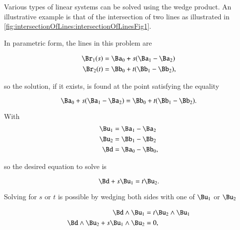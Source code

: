 %
%
Various types of linear systems can be solved using the wedge product.
An illustrative example is that of the intersection of two lines as illustrated in \cref{fig:intersectionOfLines:intersectionOfLinesFig1}.


In parametric form, the lines in this problem are

\begin{dmath}\label{eqn:SimpleProducts2:1000}
\begin{aligned}
\Br_1(s) &= \Ba_0 + s( \Ba_1 - \Ba_2 ) \\
\Br_2(t) &= \Bb_0 + t( \Bb_1 - \Bb_2 ),
\end{aligned}
\end{dmath}

so the solution, if it exists, is found at the point satisfying the equality

\begin{dmath}\label{eqn:SimpleProducts2:1020}
\Ba_0 + s( \Ba_1 - \Ba_2 ) = \Bb_0 + t( \Bb_1 - \Bb_2 ).
\end{dmath}

With
\begin{dmath}\label{eqn:SimpleProducts2:1040}
\begin{aligned}
\Bu_1 &= \Ba_1 - \Ba_2 \\
\Bu_2 &= \Bb_1 - \Bb_2 \\
\Bd &= \Ba_0 - \Bb_0,
\end{aligned}
\end{dmath}

so the desired equation to solve is

\begin{dmath}\label{eqn:SimpleProducts2:1060}
\Bd + s \Bu_1 = t \Bu_2.
\end{dmath}

Solving for \( s \) or \( t \) is possible by 
wedging both sides with one of \( \Bu_1 \) or \( \Bu_2 \)

\begin{dmath}\label{eqn:SimpleProducts2:1080}
\begin{aligned}
\Bd \wedge \Bu_1 &= t \Bu_2 \wedge \Bu_1 \\
\Bd \wedge \Bu_2 + s \Bu_1 \wedge \Bu_2 &= 0,
\end{aligned}
\end{dmath}

